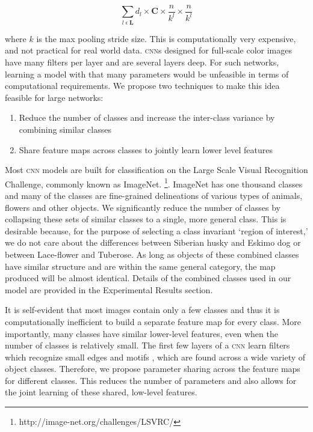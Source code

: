 \begin{equation*}
    \sum_{l \; \epsilon \; \mathbf{L}}{d_l \times \mathbf{C} \times \frac{n}{k^l} \times \frac{n}{k^l}}
\end{equation*}

where $k$ is the max pooling stride size.
This is computationally very expensive, and not practical for real world data.
\textsc{cnn}s designed for full-scale color images have many filters per layer and are several layers deep.
For such networks, learning a model with that many parameters would be unfeasible in terms of computational requirements.
We propose two techniques to make this idea feasible for large networks: 

\begin{enumerate}[i]
	 \item Reduce the number of classes and increase the inter-class variance by combining similar classes
    \item Share feature maps across classes to jointly learn lower level features
\end{enumerate}

Most \textsc{cnn} models are built for classification on the Large Scale Visual Recognition Challenge, commonly known as ImageNet.
\footnote{http://image-net.org/challenges/LSVRC/}.
ImageNet has one thousand classes and many of the classes are fine-grained delineations of various types of animals, flowers and other objects.
We significantly reduce the number of classes by collapsing these sets of similar classes to a single, more general class.
This is desirable because, for the purpose of selecting a class invariant `region of interest,' we do not care about the differences between Siberian husky and Eskimo dog or between Lace-flower and Tuberose.
As long as objects of these combined classes have similar structure and are within the same general category, the map produced will be almost identical.
Details of the combined classes used in our model are provided in the Experimental Results section.

It is self-evident that most images contain only a few classes and thus it is computationally inefficient to build a separate feature map for every class.
More importantly, many classes have similar lower-level features, even when the number of classes is relatively small.
The first few layers of a \textsc{cnn} learn filters which recognize small edges and motifs \cite{zeiler2014visualizing}, which are found across a wide variety of object classes.
Therefore, we propose parameter sharing across the feature maps for different classes.
This reduces the number of parameters and also allows for the joint learning of these shared, low-level features.

